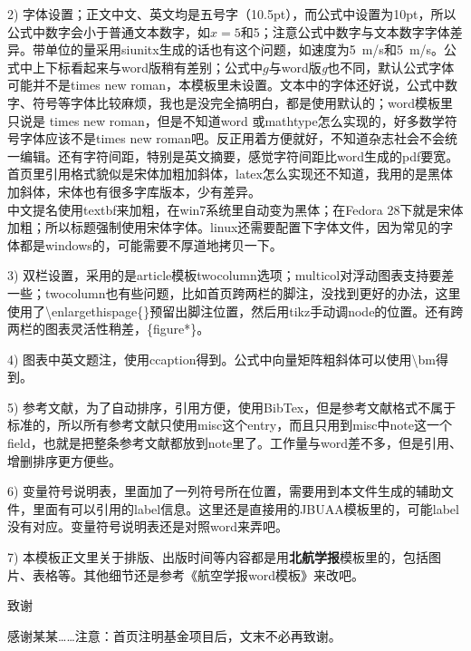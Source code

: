 \documentclass[10.5pt,twocolumn]{aaas}
\newcommand\mycolorRed[1]{{\color{red}#1}}
\begin{document}
2) \mycolorRed{字体}设置；正文中文、英文均是五号字（10.5pt），而公式中设置为10pt，所以公式中数字会小于普通文本数字，如$x=5$和5；注意公式中数字与文本数字字体差异。带单位的量采用siunitx生成的话也有这个问题，如速度为\SI{5}{m/s}和5\ m/s。公式中上下标看起来与word版稍有差别；公式中$g$与word版\textit{g}也不同，默认公式字体可能并不是times new roman，本模板里未设置。文本中的字体还好说，公式中数字、符号等字体比较麻烦，我也是没完全搞明白，都是使用默认的；word模板里只说是 times new roman，但是不知道word 或mathtype怎么实现的，好多数学符号字体应该不是times new roman吧。反正用着方便就好，不知道杂志社会不会统一编辑。还有字符间距，特别是英文摘要，感觉字符间距比word生成的pdf要宽。首页里引用格式貌似是宋体加粗加斜体，latex怎么实现还不知道，我用的是黑体加斜体，宋体也有很多字库版本，少有差异。\\
中文提名使用textbf来加粗，在win7系统里自动变为黑体；在Fedora 28下就是宋体加粗；所以标题强制使用宋体字体。linux还需要配置下字体文件，因为常见的字体都是windows的，可能需要不厚道地拷贝一下。

3) \mycolorRed{双栏}设置，采用的是article模板twocolumn选项；multicol对浮动图表支持要差一些；twocolumn也有些问题，比如首页跨两栏的脚注，没找到更好的办法，这里使用了\textbackslash enlargethispage\{\}预留出脚注位置，然后用tikz手动调node的位置。还有跨两栏的图表灵活性稍差，\{figure*\}。

4) 图表中英文题注，使用ccaption得到。公式中向量矩阵粗斜体可以使用\textbackslash bm得到。

5) 参考文献，为了自动排序，引用方便，使用BibTex，但是参考文献格式不属于标准的，所以所有参考文献只使用misc这个entry，而且只用到misc中note这一个field，也就是把整条参考文献都放到note里了。工作量与word差不多，但是引用、增删排序更方便些。

6) 变量符号说明表，里面加了一列符号所在位置，需要用到本文件生成的辅助文件，里面有可以引用的label信息。这里还是直接用的JBUAA模板里的，可能label没有对应。变量符号说明表还是对照word来弄吧。

7) \mycolorRed{本模板正文里关于排版、出版时间等内容都是用\textbf{北航学报}模板里的，包括图片、表格等。其他细节还是参考《航空学报word模板》来改吧。}

\vspace{1em}
{\noindent\xiaosihao 致\quad 谢}

\vspace{1em}
{\wuhao 
感谢某某……注意：首页注明基金项目后，文末不必再致谢。
}



\end{document}
